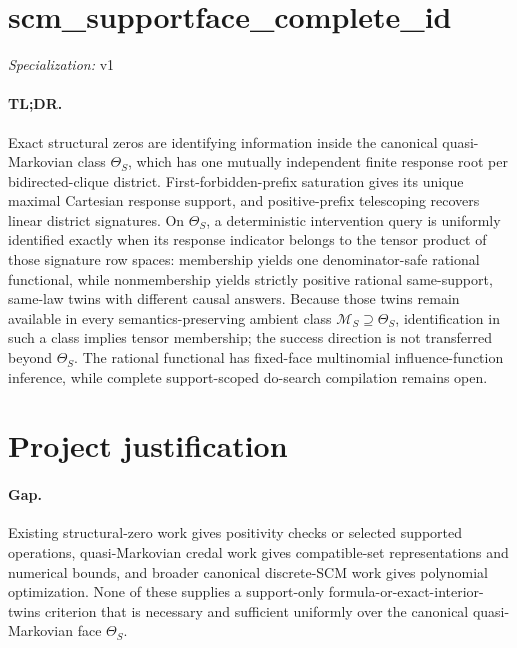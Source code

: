 \documentclass{article}
\begin{document}
\sloppy

\section*{scm\_\allowbreak{}supportface\_\allowbreak{}complete\_\allowbreak{}id}

\noindent\textit{Specialization:} v1\par

\paragraph{TL;DR.} Exact structural zeros are identifying information inside the canonical quasi-Markovian class \(\Theta_S\), which has one mutually independent finite response root per bidirected-clique district. First-forbidden-prefix saturation gives its unique maximal Cartesian response support, and positive-prefix telescoping recovers linear district signatures. On \(\Theta_S\), a deterministic intervention query is uniformly identified exactly when its response indicator belongs to the tensor product of those signature row spaces: membership yields one denominator-safe rational functional, while nonmembership yields strictly positive rational same-support, same-law twins with different causal answers. Because those twins remain available in every semantics-preserving ambient class \(\mathcal M_S\supseteq\Theta_S\), identification in such a class implies tensor membership; the success direction is not transferred beyond \(\Theta_S\). The rational functional has fixed-face multinomial influence-function inference, while complete support-scoped do-search compilation remains open.

\section{Project justification}

\paragraph{Gap.} Existing structural-zero work gives positivity checks or selected supported operations, quasi-Markovian credal work gives compatible-set representations and numerical bounds, and broader canonical discrete-SCM work gives polynomial optimization. None of these supplies a support-only formula-or-exact-interior-twins criterion that is necessary and sufficient uniformly over the canonical quasi-Markovian face \(\Theta_S\).
\end{document}
